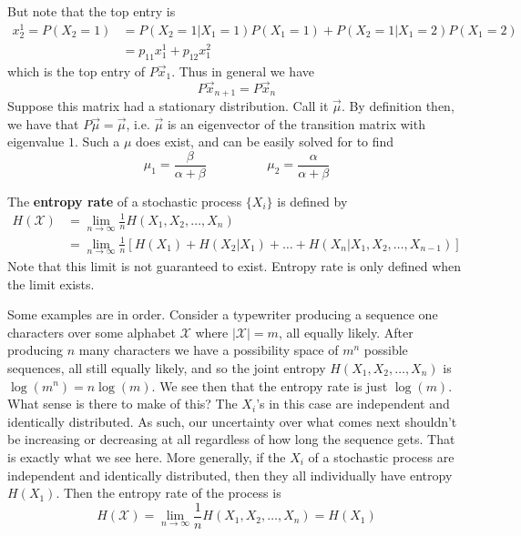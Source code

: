 But note that the top entry is 
\begin{align}
	x_2^1 = P(X_2 = 1) &= P(X_2 = 1|X_1 = 1)P(X_1 = 1) + P(X_2 = 1|X_1 = 2)P(X_1 = 2) \\
			&= p_{11}x_1^1 + p_{12}x_1^2
\end{align} 
which is the top entry of $P\vec{x}_1$. Thus in general we have 
\[ P\vec{x}_{n+1} = P\vec{x}_n \]
Suppose this matrix had a stationary distribution. Call it $\vec{\mu}$. By definition then, we have that $P\vec{\mu} = \vec{\mu}$, i.e. $\vec{\mu}$ is an eigenvector of the transition matrix with eigenvalue $1$. Such a $\mu$ does exist, and can be easily solved for to find 
\[  \mu_1 = \frac{\beta}{\alpha + \beta} \hspace{2cm} \mu_2 = \frac{\alpha}{\alpha+\beta} \]
\begin{definition}
	The \textbf{entropy rate} of a stochastic process $\{X_i\}$ is defined by 
	\begin{align}
		H(\mathcal{X}) &= \lim_{n\to \infty} \frac{1}{n}H(X_1,X_2,\ldots,X_n) \\
					&= \lim_{n\to \infty} \frac{1}{n}\left[ H(X_1) + H(X_2|X_1) + \ldots + H(X_n|X_1,X_2,\ldots,X_{n-1}) \right]
	\end{align}
	Note that this limit is not guaranteed to exist. Entropy rate is only defined when the limit exists. 
\end{definition}
Some examples are in order. Consider a typewriter producing a sequence one characters over some alphabet $\mathcal{X}$ where $|\mathcal{X}| = m$, all equally likely. After producing $n$ many characters we have a possibility space of $m^n$ possible sequences, all still equally likely, and so the joint entropy $H(X_1,X_2,\ldots,X_n)$ is $\log(m^n) = n\log(m)$. We see then that the entropy rate is just $\log(m)$. What sense is there to make of this? The $X_i$'s in this case are independent and identically distributed. As such, our uncertainty over what comes next shouldn't be increasing or decreasing at all regardless of how long the sequence gets. That is exactly what we see here. More generally, if the $X_i$ of a stochastic process are independent and identically distributed, then they all individually have entropy $H(X_1)$. Then the entropy rate of the process is 
\[ H(\mathcal{X})  = \lim_{n \to \infty}\frac{1}{n}H(X_1,X_2,\ldots,X_n) = H(X_1) \]
